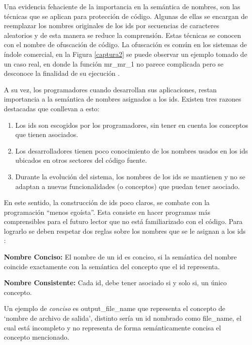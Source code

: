 Una evidencia fehaciente de la importancia en la semántica de nombres, son las técnicas que se aplican para protección de código. Algunas de ellas se encargan de reemplazar los nombres originales de los ids por secuencias de caracteres aleatorios y de esta manera se reduce la comprensión. Estas técnicas se conocen con el nombre de ofuscación de código. La ofuscación es común en los sistemas de índole comercial, en la Figura \ref{captura2} se puede observar un ejemplo tomado de un caso real, en donde la función \textsf{mr\_mr\_1} no parece complicada pero se desconoce la finalidad de su ejecución \cite{DFPM05}.

A su vez, los programadores cuando desarrollan sus aplicaciones, restan importancia a la semántica de nombres asignados a los ids. Existen tres razones destacadas que conllevan a esto:

\begin{enumerate}
\itemsep0em%
\item Los ids son escogidos por los programadores, sin tener en cuenta los conceptos que tienen asociados.

\item Los desarrolladores tienen poco conocimiento de los nombres usados en los ids ubicados en otros sectores del código fuente.

\item Durante la evolución del sistema, los nombres de los ids se mantienen y no se adaptan a nuevas funcionalidades (o conceptos) que puedan tener asociado.
\end{enumerate}

En este sentido, la construcción de ids poco claros, se combate con la programación “menos egoísta”. Esta consiste en hacer programas más comprensibles para el futuro lector que no está familiarizado con el código. Para lograrlo se deben respetar dos reglas sobre los nombres que se le asignan a los ids \cite{DFPM05,DLHD06}:

\begin{framed}
\noindent \textbf{Nombre Conciso:} El nombre de un id es conciso, si la semántica del nombre coincide exactamente con la semántica del concepto que el id representa.

\noindent \textbf{Nombre Consistente:} Cada id, debe tener asociado si y solo si, un único concepto.
\end{framed}

Un ejemplo de \textit{conciso} es \textsf{output\_file\_name} que representa el concepto de `nombre de archivo de salida', distinto sería un id nombrado como \textsf{file\_name}, el cual está incompleto y no representa de forma semánticamente concisa el concepto mencionado.


